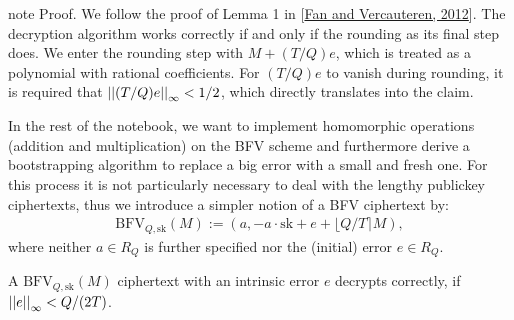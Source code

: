 \documentclass[letterpaper,10pt,english]{jupyterBook}
\begin{document}
\begin{sphinxadmonition}{note}
\sphinxAtStartPar
Proof. We follow the proof of Lemma 1 in {[}\hyperlink{cite.Thesis:id70}{Fan and Vercauteren, 2012}{]}.
The decryption algorithm works correctly if and only if the rounding as its final step does.
We enter the rounding step with \(M + (T/Q)e\), which is treated as a polynomial with rational coefficients.
For \((T/Q)e\) to vanish during rounding, it is required that \(\left\lvert\left\lvert (T/Q)e \right\rvert\right\rvert_\infty < 1/2\), which directly translates into the claim.
\end{sphinxadmonition}

\sphinxAtStartPar
In the rest of the notebook, we want to implement homomorphic operations (addition and multiplication) on the BFV scheme and furthermore derive a bootstrapping algorithm to replace a big error with a small and fresh one.
For this process it is not particularly necessary to deal with the lengthy public\sphinxhyphen{}key ciphertexts, thus we introduce a simpler notion of a BFV ciphertext by:
\begin{equation*}
\begin{split}\mathrm{BFV}_{Q,\mathrm{sk}}(M) := (a, -a\cdot\mathrm{sk}+e+\lfloor Q/T\rceil M),\end{split}
\end{equation*}
\sphinxAtStartPar
where neither \(a \in R_Q\) is further specified nor the (initial) error \(e \in R_Q\).

\sphinxAtStartPar
A \(\mathrm{BFV}_{Q,\mathrm{sk}}(M)\) ciphertext with an intrinsic error \(e\) decrypts correctly, if \(\left\lvert\left\lvert e \right\rvert\right\rvert_\infty < Q/(2T)\).

\begin{DUlineblock}{0em}
\item[] 
\end{DUlineblock}
\end{document}
